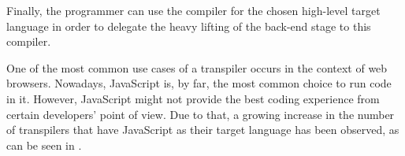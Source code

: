Finally, the programmer can use the compiler for the chosen high-level target language in order to delegate the heavy lifting of the back-end stage to this compiler. 

One of the most common use cases of a transpiler occurs in the context of web browsers. Nowadays, JavaScript is, by far, the most common choice to run code in it. However, JavaScript might not provide the best coding experience from certain developers' point of view. Due to that, a growing increase in the number of transpilers that have JavaScript as their target language has been observed, as can be seen in \cite{coffeescriptCompileToJS}.
